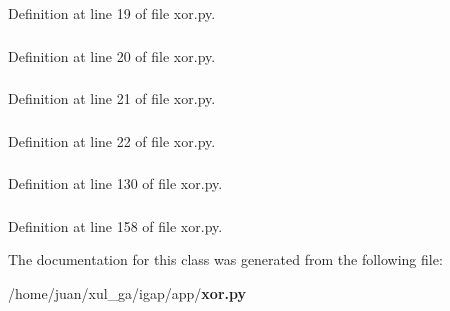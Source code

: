 Definition at line 19 of file xor.py.
\subsubsection{}\label{classapp_1_1xor_1_1Xor_af1b9645669091023f5caea5eda6702a}




Definition at line 20 of file xor.py.
\subsubsection{}\label{classapp_1_1xor_1_1Xor_c231eb6be344746788f5c8b949acecc2}




Definition at line 21 of file xor.py.
\subsubsection{}\label{classapp_1_1xor_1_1Xor_f3d28aa41221b57168d7460794bced42}




Definition at line 22 of file xor.py.
\subsubsection{}\label{classapp_1_1xor_1_1Xor_74278a43895d5bcb304c751185ce7b28}




Definition at line 130 of file xor.py.
\subsubsection{}\label{classapp_1_1xor_1_1Xor_08ac3038c808458aebee1d6e1b7b00df}




Definition at line 158 of file xor.py.

The documentation for this class was generated from the following file:\begin{CompactItemize}
\item 
/home/juan/xul\_\-ga/igap/app/{\bf xor.py}\end{CompactItemize}
